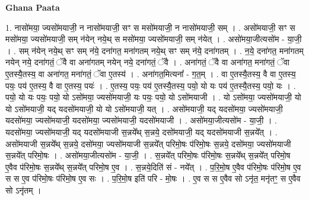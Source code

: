 \documentclass[17pt]{extarticle}
\begin{document}
\textbf{Ghana Paata } \newline

1. नासो॑मया॒ ज्यसो॑मयाजी॒ न नासो॑मयाजी॒ सꣳ स मसो॑मयाजी॒ न नासो॑मयाजी॒ सम् । . असो॑मयाजी॒ सꣳ स मसो॑मया॒ ज्यसो॑मयाजी॒ सम् न॑येन् नये॒थ् स मसो॑मया॒ ज्यसो॑मयाजी॒ सम् न॑येत् । . असो॑मया॒जीत्यसो॑म - या॒जी॒ । . सम् न॑येन् नये॒थ् सꣳ सम् न॑ये॒ दना॑गत॒ मना॑गतम् नये॒थ् सꣳ सम् न॑ये॒ दना॑गतम् । . न॒ये॒ दना॑गत॒ मना॑गतम् नयेन् नये॒ दना॑गतं॒ ॅवै वा अना॑गतम् नयेन् नये॒ दना॑गतं॒ ॅवै । . अना॑गतं॒ ॅवै वा अना॑गत॒ मना॑गतं॒ ॅवा ए॒तस्यै॒तस्य॒ वा अना॑गत॒ मना॑गतं॒ ॅवा ए॒तस्य॑ । . अना॑गत॒मित्यना᳚ - ग॒त॒म् । . वा ए॒तस्यै॒तस्य॒ वै वा ए॒तस्य॒ पयः॒ पय॑ ए॒तस्य॒ वै वा ए॒तस्य॒ पयः॑ । . ए॒तस्य॒ पयः॒ पय॑ ए॒तस्यै॒तस्य॒ पयो॒ यो यः पय॑ ए॒तस्यै॒तस्य॒ पयो॒ यः । . पयो॒ यो यः पयः॒ पयो॒ यो ऽसो॑मया॒ ज्यसो॑मयाजी॒ यः पयः॒ पयो॒ यो ऽसो॑मयाजी । . यो ऽसो॑मया॒ ज्यसो॑मयाजी॒ यो यो ऽसो॑मयाजी॒ यद् यदसो॑मयाजी॒ यो यो ऽसो॑मयाजी॒ यत् । . असो॑मयाजी॒ यद् यदसो॑मया॒ ज्यसो॑मयाजी॒ यदसो॑मया॒ ज्यसो॑मयाजी॒ यदसो॑मया॒ ज्यसो॑मयाजी॒ यदसो॑मयाजी । . असो॑मया॒जीत्यसो॑म - या॒जी॒ । . यदसो॑मया॒ ज्यसो॑मयाजी॒ यद् यदसो॑मयाजी स॒न्नये᳚थ् स॒न्नये॒ दसो॑मयाजी॒ यद् यदसो॑मयाजी स॒न्नये᳚त् । . असो॑मयाजी स॒न्नये᳚थ् स॒न्नये॒ दसो॑मया॒ ज्यसो॑मयाजी स॒न्नये᳚त् परिमो॒षः प॑रिमो॒षः स॒न्नये॒ दसो॑मया॒ ज्यसो॑मयाजी स॒न्नये᳚त् परिमो॒षः । . असो॑मया॒जीत्यसो॑म - या॒जी॒ । . स॒न्नये᳚त् परिमो॒षः प॑रिमो॒षः स॒न्नये᳚थ् स॒न्नये᳚त् परिमो॒ष ए॒वैव प॑रिमो॒षः स॒न्नये᳚थ् स॒न्नये᳚त् परिमो॒ष ए॒व । . स॒न्नये॒दिति॑ सं - नये᳚त् । . प॒रि॒मो॒ष ए॒वैव प॑रिमो॒षः प॑रिमो॒ष ए॒व स स ए॒व प॑रिमो॒षः प॑रिमो॒ष ए॒व सः । . प॒रि॒मो॒ष इति॑ परि - मो॒षः । . ए॒व स स ए॒वैव सो ऽनृ॑त॒ मनृ॑तꣳ॒॒ स ए॒वैव सो ऽनृ॑तम् । \newline
\end{document}
